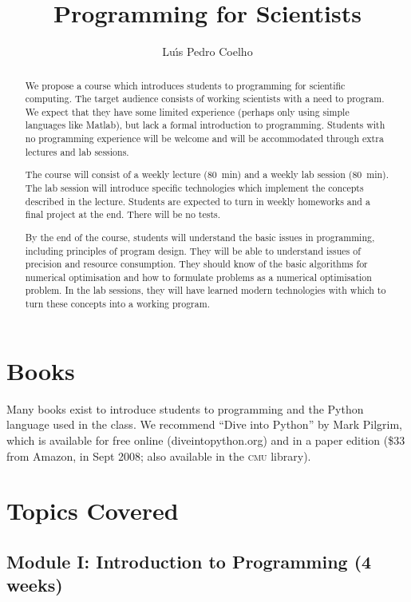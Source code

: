 \documentclass{article}
\title{Programming for Scientists}
\author{Lu\'\i s Pedro Coelho}
\begin{document}
\maketitle

\begin{abstract}
We propose a course which introduces students to programming for scientific computing. The target audience consists of working scientists with a need to program. We expect that they have some limited experience (perhaps only using simple languages like Matlab), but lack a formal introduction to programming. Students with no programming experience will be welcome and will be accommodated through extra lectures and lab sessions.

The course will consist of a weekly lecture (80~min) and a weekly lab session (80~min). The lab session will introduce specific technologies which implement the concepts described in the lecture. Students are expected to turn in weekly homeworks and a final project at the end. There will be no tests.

By the end of the course, students will understand the basic issues in programming, including principles of program design. They will be able to understand issues of precision and resource consumption. They should know of the basic algorithms for numerical optimisation and how to formulate problems as a numerical optimisation problem. In the lab sessions, they will have learned modern technologies with which to turn these concepts into a working program.
\end{abstract}

\section{Books}

Many books exist to introduce students to programming and the Python language used in the class. We recommend ``Dive into Python'' by Mark Pilgrim, which is available for free online (diveintopython.org) and in a paper edition (\$33 from Amazon, in Sept 2008; also available in the \textsc{cmu} library).

\section{Topics Covered}

\subsection{Module I: Introduction to Programming (4 weeks)}
\end{document}
